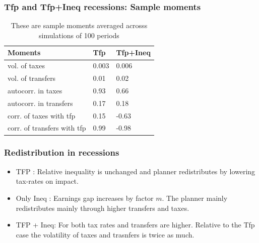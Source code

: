 \documentclass{beamer}
\begin{document}
\begin{frame}
\frametitle{Tfp and Tfp+Ineq recessions: Sample moments}
\begin{table}[htp]
\small
\begin{tabular}{|l|l|l|}
\hline
Moments &Tfp& Tfp+Ineq\\\hline
vol. of taxes & 0.003&0.006\\
vol. of transfers &0.01 &0.02\\
autocorr. in taxes& 0.93&0.66\\
autocorr. in transfers& 0.17&0.18\\
corr. of taxes with tfp &0.15 &-0.63\\
corr. of transfers with tfp & 0.99&-0.98\\ \hline
\end{tabular}
\caption{These are sample moments averaged acrosss simulations of 100 periods}
\label{tab:corr}
\end{table}

\end{frame}


\begin{frame}
\frametitle{Redistribution in recessions}
\begin{itemize}
 \item TFP : Relative inequality is unchanged and planner redistributes by lowering tax-rates on impact.
 \item Only Ineq : Earnings gap increases by factor $m$. The planner mainly redistributes mainly through higher transfers and taxes.
 \item TFP + Ineq: For both tax rates and transfers are higher. Relative to the Tfp case the volatility of taxes and trasnfers is twice as much.
\end{itemize}
\end{frame}


 
\end{document}
